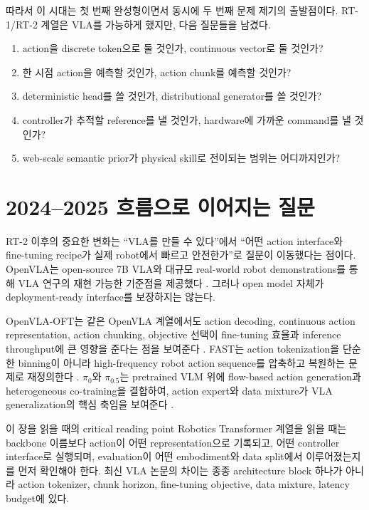 따라서 이 시대는 첫 번째 완성형이면서 동시에 두 번째 문제 제기의 출발점이다. RT-1/RT-2 계열은 VLA를 가능하게 했지만, 다음 질문들을 남겼다.
\begin{enumerate}
  \item action을 discrete token으로 둘 것인가, continuous vector로 둘 것인가?
  \item 한 시점 action을 예측할 것인가, action chunk를 예측할 것인가?
  \item deterministic head를 쓸 것인가, distributional generator를 쓸 것인가?
  \item controller가 추적할 reference를 낼 것인가, hardware에 가까운 command를 낼 것인가?
  \item web-scale semantic prior가 physical skill로 전이되는 범위는 어디까지인가?
\end{enumerate}

\section{2024--2025 흐름으로 이어지는 질문}

RT-2 이후의 중요한 변화는 ``VLA를 만들 수 있다''에서 ``어떤 action interface와 fine-tuning recipe가 실제 robot에서 빠르고 안전한가''로 질문이 이동했다는 점이다. OpenVLA는 open-source 7B VLA와 대규모 real-world robot demonstrations를 통해 VLA 연구의 재현 가능한 기준점을 제공했다 \cite{openvla2024}. 그러나 open model 자체가 deployment-ready interface를 보장하지는 않는다.

OpenVLA-OFT는 같은 OpenVLA 계열에서도 action decoding, continuous action representation, action chunking, objective 선택이 fine-tuning 효율과 inference throughput에 큰 영향을 준다는 점을 보여준다 \cite{openvlaoft2025}. FAST는 action tokenization을 단순한 binning이 아니라 high-frequency robot action sequence를 압축하고 복원하는 문제로 재정의한다 \cite{fast2025}. $\pi_0$와 $\pi_{0.5}$는 pretrained VLM 위에 flow-based action generation과 heterogeneous co-training을 결합하여, action expert와 data mixture가 VLA generalization의 핵심 축임을 보여준다 \cite{pi02024,pi052025}.

\begin{warningbox}{이 장을 읽을 때의 critical reading point}
Robotics Transformer 계열을 읽을 때는 backbone 이름보다 action이 어떤 representation으로 기록되고, 어떤 controller interface로 실행되며, evaluation이 어떤 embodiment와 data split에서 이루어졌는지를 먼저 확인해야 한다. 최신 VLA 논문의 차이는 종종 architecture block 하나가 아니라 action tokenizer, chunk horizon, fine-tuning objective, data mixture, latency budget에 있다.
\end{warningbox}

